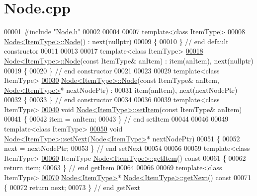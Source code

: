 \hypertarget{Node_8cpp_source}{}\section{Node.\+cpp}

\begin{DoxyCode}
00001 \textcolor{preprocessor}{#include "\hyperlink{Node_8h}{Node.h}"}
00002 
00004 
00007 \textcolor{keyword}{template}<\textcolor{keyword}{class} ItemType>
\hyperlink{classNode_a627e94f4fba0e73c546e0fb2a7266f36}{00008} \hyperlink{classNode_a627e94f4fba0e73c546e0fb2a7266f36}{Node<ItemType>::Node}() : next(nullptr)
00009 \{
00010 \} \textcolor{comment}{// end default constructor}
00011 
00013 
00017 \textcolor{keyword}{template}<\textcolor{keyword}{class} ItemType>
\hyperlink{classNode_a0288598fcb0244739ce95099c26250ae}{00018} \hyperlink{classNode_a627e94f4fba0e73c546e0fb2a7266f36}{Node<ItemType>::Node}(\textcolor{keyword}{const} ItemType& anItem) : item(anItem), next(nullptr)
00019 \{
00020 \} \textcolor{comment}{// end constructor}
00021 
00023 
00029 \textcolor{keyword}{template}<\textcolor{keyword}{class} ItemType>
\hyperlink{classNode_adf98d3f9b7227622cb5a0fdd7e8f0b18}{00030} \hyperlink{classNode_a627e94f4fba0e73c546e0fb2a7266f36}{Node<ItemType>::Node}(\textcolor{keyword}{const} ItemType& anItem, \hyperlink{classNode}{Node<ItemType>}* nextNodePtr)
       :
00031     item(anItem), next(nextNodePtr)
00032 \{
00033 \} \textcolor{comment}{// end constructor}
00034 
00036 
00039 \textcolor{keyword}{template}<\textcolor{keyword}{class} ItemType>
\hyperlink{classNode_ab4ceecdecc5df799011de486b9f54974}{00040} \textcolor{keywordtype}{void} \hyperlink{classNode_ab4ceecdecc5df799011de486b9f54974}{Node<ItemType>::setItem}(\textcolor{keyword}{const} ItemType& anItem)
00041 \{
00042     item = anItem;
00043 \} \textcolor{comment}{// end setItem}
00044 
00046 
00049 \textcolor{keyword}{template}<\textcolor{keyword}{class} ItemType>
\hyperlink{classNode_a01c1a66d4e39f5b149e090413deb4633}{00050} \textcolor{keywordtype}{void} \hyperlink{classNode_a01c1a66d4e39f5b149e090413deb4633}{Node<ItemType>::setNext}(\hyperlink{classNode}{Node<ItemType>}* nextNodePtr)
00051 \{
00052     next = nextNodePtr;
00053 \} \textcolor{comment}{// end setNext}
00054 
00056 
00059 \textcolor{keyword}{template}<\textcolor{keyword}{class} ItemType>
\hyperlink{classNode_a6c08caef312b6f2f69b5e090cf047514}{00060} ItemType \hyperlink{classNode_a6c08caef312b6f2f69b5e090cf047514}{Node<ItemType>::getItem}()\textcolor{keyword}{ const}
00061 \textcolor{keyword}{}\{
00062     \textcolor{keywordflow}{return} item;
00063 \} \textcolor{comment}{// end getItem}
00064 
00066 
00069 \textcolor{keyword}{template}<\textcolor{keyword}{class} ItemType>
\hyperlink{classNode_a3eb0c96e03a3fd46ea1cff4c305bbedd}{00070} \hyperlink{classNode}{Node<ItemType>}* \hyperlink{classNode_a3eb0c96e03a3fd46ea1cff4c305bbedd}{Node<ItemType>::getNext}()\textcolor{keyword}{ const}
00071 \textcolor{keyword}{}\{
00072     \textcolor{keywordflow}{return} next;
00073 \} \textcolor{comment}{// end getNext}
\end{DoxyCode}
